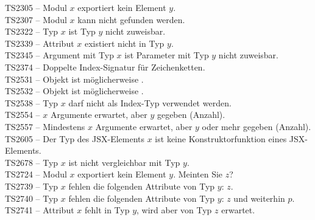 \begin{table}[p]
{    TS2305 -- Modul $x$ exportiert kein Element $y$.\\
    TS2307 -- Modul $x$ kann nicht gefunden werden.\\
    TS2322 -- Typ $x$ ist Typ $y$ nicht zuweisbar.\\
    TS2339 -- Attribut $x$ existiert nicht in Typ $y$.\\
    TS2345 -- Argument mit Typ $x$ ist Parameter mit Typ $y$ nicht zuweisbar.\\
    TS2374 -- Doppelte Index-Signatur für Zeichenketten.\\
    TS2531 -- Objekt ist möglicherweise .\\
    TS2532 -- Objekt ist möglicherweise .\\
    TS2538 -- Typ $x$ darf nicht als Index-Typ verwendet werden.\\
    TS2554 -- $x$ Argumente erwartet, aber $y$ gegeben (Anzahl).\\
    TS2557 -- Mindestens $x$ Argumente erwartet, aber $y$ oder mehr gegeben (Anzahl).\\
    TS2605 -- Der Typ des JSX-Elements $x$ ist keine Konstruktorfunktion eines JSX-Elements.\\
    TS2678 -- Typ $x$ ist nicht vergleichbar mit Typ $y$.\\
    TS2724 -- Modul $x$ exportiert kein Element $y$. Meinten Sie $z$?\\
    TS2739 -- Typ $x$ fehlen die folgenden Attribute von Typ $y$: $z$.\\
    TS2740 -- Typ $x$ fehlen die folgenden Attribute von Typ $y$: $z$ und weiterhin $p$.\\
    TS2741 -- Attribut $x$ fehlt in Typ $y$, wird aber von Typ $z$ erwartet.\\
  }
  \vspace{\baselineskip}
  \label{tab:type-errors}
\end{table}
